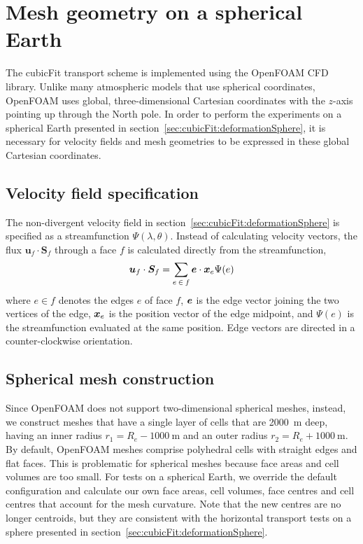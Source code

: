 \chapter{Mesh geometry on a spherical Earth}

The cubicFit transport scheme is implemented using the OpenFOAM CFD library.  Unlike many atmospheric models that use spherical coordinates, OpenFOAM uses global, three-dimensional Cartesian coordinates with the $z$-axis pointing up through the North pole.  In order to perform the experiments on a spherical Earth presented in section~\ref{sec:cubicFit:deformationSphere}, it is necessary for velocity fields and mesh geometries to be expressed in these global Cartesian coordinates.

\section*{Velocity field specification}
The non-divergent velocity field in section~\ref{sec:cubicFit:deformationSphere} is specified as a streamfunction $\Psi(\lambda, \theta)$.  Instead of calculating velocity vectors, the flux $\mathbf{u}_f \cdot \mathbf{S}_f$ through a face $f$ is calculated directly from the streamfunction,
\begin{align}
	\bm{u}_f \cdot \bm{S}_f = \sum_{e\:\in\:f} \bm{e} \cdot \bm{x}_e \Psi(e) \label{eqn:spherical:nondiv-spherical-flux}
\end{align}
where $e \in f$ denotes the edges $e$ of face $f$, $\bm{e}$ is the edge vector joining the two vertices of the edge, $\bm{x}_e$ is the position vector of the edge midpoint, and $\Psi(e)$ is the streamfunction evaluated at the same position.
Edge vectors are directed in a counter-clockwise orientation.

\section*{Spherical mesh construction}

Since OpenFOAM does not support two-dimensional spherical meshes, instead, we construct meshes that have a single layer of cells that are \SI{2000}{\meter} deep, having an inner radius $r_1 = R_e - \SI{1000}{\meter}$ and an outer radius $r_2 = R_e + \SI{1000}{\meter}$.
By default, OpenFOAM meshes comprise polyhedral cells with straight edges and flat faces.  This is problematic for spherical meshes because face areas and cell volumes are too small.
For tests on a spherical Earth, we override the default configuration and calculate our own face areas, cell volumes, face centres and cell centres that account for the mesh curvature.  Note that the new centres are no longer centroids, but they are consistent with the horizontal transport tests on a sphere presented in section~\ref{sec:cubicFit:deformationSphere}.

